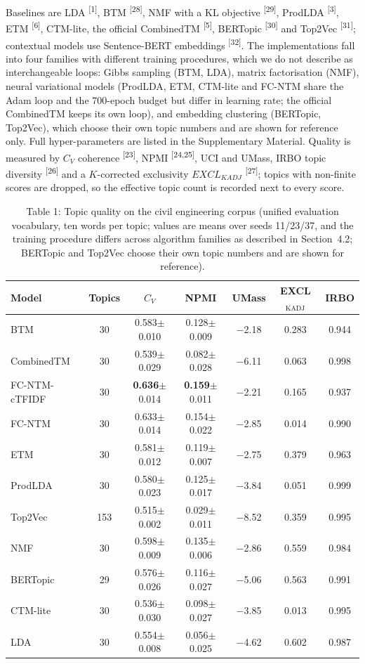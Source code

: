 \documentclass{article}
\begin{document}
Baselines are LDA \textsuperscript{[1]}, BTM \textsuperscript{[28]}, NMF with a KL objective
\textsuperscript{[29]}, ProdLDA \textsuperscript{[3]}, ETM \textsuperscript{[6]}, CTM-lite, the
official CombinedTM \textsuperscript{[5]}, BERTopic \textsuperscript{[30]} and Top2Vec
\textsuperscript{[31]}; contextual models use Sentence-BERT embeddings
\textsuperscript{[32]}. The implementations fall into four families with different training
procedures, which we do not describe as interchangeable loops: Gibbs sampling (BTM, LDA), matrix
factorisation (NMF), neural variational models (ProdLDA, ETM, CTM-lite and FC-NTM share the Adam
loop and the 700-epoch budget but differ in learning rate; the official CombinedTM keeps its own
loop), and embedding clustering (BERTopic, Top2Vec), which choose their own topic numbers and are
shown for reference only. Full hyper-parameters are listed in the Supplementary Material. Quality
is measured by $C_V$ coherence \textsuperscript{[23]}, NPMI \textsuperscript{[24,25]}, UCI
and UMass, IRBO topic diversity \textsuperscript{[26]} and a $K$-corrected exclusivity
$EXCL_{KADJ}$ \textsuperscript{[27]}; topics with non-finite scores are dropped, so the
effective topic count is recorded next to every score.

 \begin{table}[t]
\centering
\caption{Table 1: Topic quality on the civil engineering corpus (unified evaluation vocabulary, ten words per topic; values are means over seeds 11/23/37, and the training procedure differs across algorithm families as described in Section~4.2; BERTopic and Top2Vec choose their own topic numbers and are shown for reference).}
\label{tab:civil}
\small
\begin{tabular}{lcccccc}
\toprule
Model & Topics & $C_V$ & NPMI & UMass & EXCL$_{\mathrm{KADJ}}$ & IRBO \\
\midrule
BTM & 30 & 0.583$\pm$0.010 & 0.128$\pm$0.009 & $-$2.18 & 0.283 & 0.944 \\
CombinedTM & 30 & 0.539$\pm$0.029 & 0.082$\pm$0.028 & $-$6.11 & 0.063 & 0.998 \\
FC-NTM-cTFIDF & 30 & \textbf{0.636}$\pm$0.014 & \textbf{0.159}$\pm$0.011 & $-$2.21 & 0.165 & 0.937 \\
FC-NTM & 30 & 0.633$\pm$0.014 & 0.154$\pm$0.022 & $-$2.85 & 0.014 & 0.990 \\
ETM & 30 & 0.581$\pm$0.012 & 0.119$\pm$0.007 & $-$2.75 & 0.379 & 0.963 \\
ProdLDA & 30 & 0.580$\pm$0.023 & 0.125$\pm$0.017 & $-$3.84 & 0.051 & 0.999 \\
Top2Vec & 153 & 0.515$\pm$0.002 & 0.029$\pm$0.011 & $-$8.52 & 0.359 & 0.995 \\
NMF & 30 & 0.598$\pm$0.009 & 0.135$\pm$0.006 & $-$2.86 & 0.559 & 0.984 \\
BERTopic & 29 & 0.576$\pm$0.026 & 0.116$\pm$0.027 & $-$5.06 & 0.563 & 0.991 \\
CTM-lite & 30 & 0.536$\pm$0.030 & 0.098$\pm$0.027 & $-$3.85 & 0.013 & 0.995 \\
LDA & 30 & 0.554$\pm$0.008 & 0.056$\pm$0.025 & $-$4.62 & 0.602 & 0.987 \\
\bottomrule
\end{tabular}
\end{table}
\end{document}
